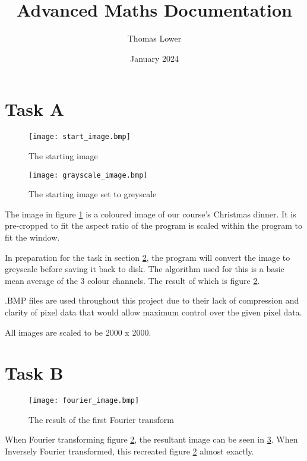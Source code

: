 \documentclass{article}
\title{Advanced Maths Documentation}
\author{Thomas Lower}
\date{January 2024}
\begin{document}
\maketitle

\pagebreak

\section{Task A} \label{a}

\begin{figure}[h]
    \centering
    \caption{The starting image}
    \label{fig:start}
    \texttt{[image: start\_image.bmp]}
\end{figure}

\begin{figure}[h]
    \centering
    \caption{The starting image set to greyscale}
    \label{fig:greyscale}
    \texttt{[image: grayscale\_image.bmp]}
\end{figure}

The image in figure \ref{fig:start} is a coloured image of our course's Christmas dinner. It is pre-cropped to fit the aspect ratio of the program is scaled within the program to fit the window.

In preparation for the task in section \ref{b}, the program will convert the image to greyscale before saving it back to disk. The algorithm used for this is a basic mean average of the 3 colour channels. The result of which is figure \ref{fig:greyscale}.

.BMP files are used throughout this project due to their lack of compression and clarity of pixel data that would allow maximum control over the given pixel data.

All images are scaled to be 2000 x 2000.

\section{Task B} \label{b}

\begin{figure}[h]
    \centering
    \caption{The result of the first Fourier transform}
    \label{fig:fourier}
    \texttt{[image: fourier\_image.bmp]}
\end{figure}

When Fourier transforming figure \ref{fig:greyscale}, the resultant image can be seen in \ref{fig:fourier}. When Inversely Fourier transformed, this recreated figure \ref{fig:greyscale} almost exactly.
\end{document}
